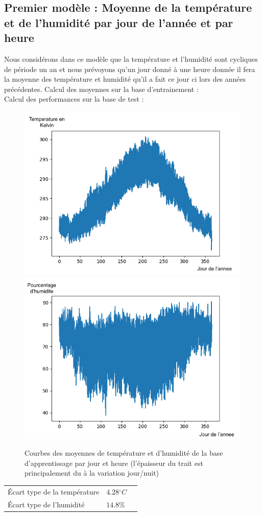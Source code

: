 \documentclass[11pt,a4paper]{article}
\begin{document}

\subsection{Premier modèle : Moyenne de la température et de l'humidité par jour de l'année et par heure }
Nous considérons dans ce modèle que la température et l'humidité sont cycliques de période un an et nous prévoyons qu'un jour donné à une heure donnée il fera la moyenne des température et humidité qu'il a fait ce jour ci lors des années précédentes.
Calcul des moyennes sur la base d'entrainement : \\
Calcul des performances sur la base de test : \\

\begin{figure} [!h]
\centering
\includegraphics[width=0.48 \textwidth]{./imagesTIPE/moyenneT.png}\quad
\includegraphics[width=0.48 \textwidth]{./imagesTIPE/moyenneH.png}
\caption{\label{fig:xxx} Courbes des moyennes de température et d'humidité de la base d'apprentissage par jour et heure (l'épaisseur du trait est principalement du à la variation jour/nuit)}
\end{figure}

\begin{tabular}{lll}\hline
\hline
Écart type de la température& $4.28{}^{\circ}C$\\
Écart type de l'humidité       &  $ 14.8\% $\\
\hline 
\end{tabular}
\end{document}
